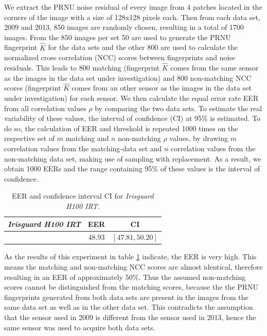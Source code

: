 \documentclass[10pt,twocolumn,letterpaper]{article}
\begin{document}
We extract the PRNU noise residual of every image from 4 patches located in the corners of the image with a size of 128x128 pixels each. Then from each data set, 2009 and 2013, 850 images are randomly chosen, resulting in a total of 1700 images. From the 850 images per set 50 are used to generate the PRNU fingerprint $\hat{K}$ for the data sets and the other 800 are used to calculate the normalized cross correlation (NCC) scores between fingerprints and noise residuals. 
This leads to 800 matching (fingerprint $\hat{K}$ comes from the same sensor as the images in the data set under investigation) and 800 non-matching NCC scores (fingerprint $\hat{K}$ comes from an other sensor as the images in the data set under investigation) for each sensor.
We then calculate the equal error rate EER from all correlation values $\rho$ by comparing the two data sets. To estimate the real variability of these values, the interval of confidence (CI) at 95\% is estimated. To do so, the calculation of EER and threshold is repeated 1000 times on the respective set of $m$ matching and $n$ non-matching $\rho$ values, by drawing $m$ correlation values from the matching-data set and $n$ correlation values from the non-matching data set, making use of sampling with replacement. As a result, we obtain 1000 EERs and the range containing 95\% of these values is the interval of confidence. 

  \begin{table}[hbt] 
   \begin{center}
	\begin{tabular}{ c | c | c}
		  \emph{Irisguard H100 IRT} & EER & CI \\ 
		  \hline
		   [\%] &  48.93 & $[47.81 , 50.20]$
	\end{tabular}
   \end{center}
     \caption{EER and confidence interval CI for \emph{Irisguard H100 IRT}.}
\label{table:sensor_identification}
 \end{table}

As the results of this experiment in table \ref{table:sensor_identification} indicate, the EER is very high. This means the matching and non-matching NCC scores are almost identical, therefore resulting in an EER of approximately 50\%. Thus the assumed non-matching scores cannot be distinguished from the matching scores, because the the PRNU fingerprints generated from both data sets are present in the images from the same data set as well as in the other data set. This contradicts the assumption that the sensor used in 2009 is different from the sensor used in 2013, hence the same sensor was used to acquire both data sets.
\end{document}
